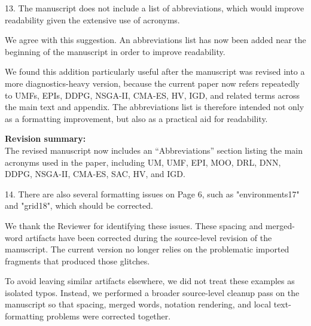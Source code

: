 \begin{ReviewerComment}
13. The manuscript does not include a list of abbreviations, which would improve readability given the extensive use of acronyms.
\end{ReviewerComment}
%
\begin{Answer}
We agree with this suggestion. An abbreviations list has now been added near the beginning of the manuscript in order to improve readability.

We found this addition particularly useful after the manuscript was revised into a more diagnostics-heavy version, because the current paper now refers repeatedly to UMFs, EPIs, DDPG, NSGA-II, CMA-ES, HV, IGD, and related terms across the main text and appendix. The abbreviations list is therefore intended not only as a formatting improvement, but also as a practical aid for readability.
\end{Answer}
\begin{RevisionExcerpt}
\noindent\textbf{Revision summary:}\\
The revised manuscript now includes an ``Abbreviations'' section listing the main acronyms used in the paper, including UM, UMF, EPI, MOO, DRL, DNN, DDPG, NSGA-II, CMA-ES, SAC, HV, and IGD.
\end{RevisionExcerpt}

\begin{ReviewerComment}
14. There are also several formatting issues on Page 6, such as "environments17" and "grid18", which should be corrected.
\end{ReviewerComment}
%
\begin{Answer}
We thank the Reviewer for identifying these issues. These spacing and merged-word artifacts have been corrected during the source-level revision of the manuscript. The current version no longer relies on the problematic imported fragments that produced those glitches.

To avoid leaving similar artifacts elsewhere, we did not treat these examples as isolated typos. Instead, we performed a broader source-level cleanup pass on the manuscript so that spacing, merged words, notation rendering, and local text-formatting problems were corrected together.
\end{Answer}
